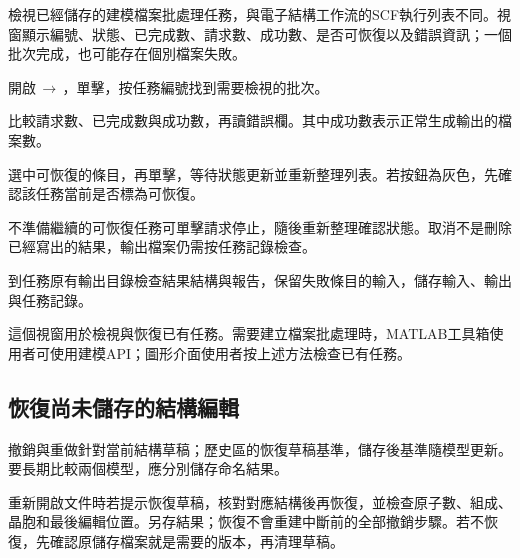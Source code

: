 檢視已經儲存的建模檔案批處理任務，與電子結構工作流的SCF執行列表不同。視窗顯示編號、狀態、已完成數、請求數、成功數、是否可恢復以及錯誤資訊；一個批次完成，也可能存在個別檔案失敗。

\begin{steps}
  \item 開啟\,$\rightarrow$\,，單擊，按任務編號找到需要檢視的批次。
  \item 比較請求數、已完成數與成功數，再讀錯誤欄。其中成功數表示正常生成輸出的檔案數。
  \item 選中可恢復的條目，再單擊，等待狀態更新並重新整理列表。若按鈕為灰色，先確認該任務當前是否標為可恢復。
  \item 不準備繼續的可恢復任務可單擊請求停止，隨後重新整理確認狀態。取消不是刪除已經寫出的結果，輸出檔案仍需按任務記錄檢查。
  \item 到任務原有輸出目錄檢查結果結構與報告，保留失敗條目的輸入，儲存輸入、輸出與任務記錄。
\end{steps}

這個視窗用於檢視與恢復已有任務。需要建立檔案批處理時，MATLAB\regmark{}工具箱使用者可使用建模API；圖形介面使用者按上述方法檢查已有任務。

\subsection{恢復尚未儲存的結構編輯}\label{sec:modeling-draft-reference}

撤銷與重做針對當前結構草稿；歷史區的恢復草稿基準，儲存後基準隨模型更新。要長期比較兩個模型，應分別儲存命名結果。

重新開啟文件時若提示恢復草稿，核對對應結構後再恢復，並檢查原子數、組成、晶胞和最後編輯位置。另存結果；恢復不會重建中斷前的全部撤銷步驟。若不恢復，先確認原儲存檔案就是需要的版本，再清理草稿。
